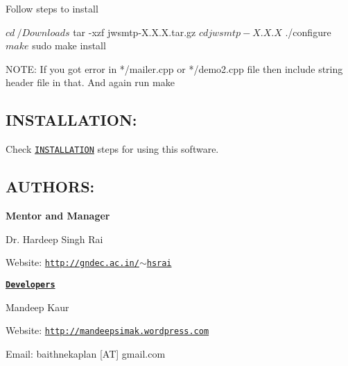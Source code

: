 Follow steps to install \begin{DoxyVerb}$ cd ~/Downloads
$ tar -xzf jwsmtp-X.X.X.tar.gz
$ cd jwsmtp-X.X.X
$ ./configure
$ make
$ sudo make install

NOTE: If you got error in */mailer.cpp or */demo2.cpp file then
include string header file in that. And again run make
\end{DoxyVerb}


\subsection*{I\-N\-S\-T\-A\-L\-L\-A\-T\-I\-O\-N\-: }

Check \href{https://github.com/GreatDevelopers/bakaplan/blob/master/INSTALLATION.txt}{\tt I\-N\-S\-T\-A\-L\-L\-A\-T\-I\-O\-N} steps for using this software.

\subsection*{A\-U\-T\-H\-O\-R\-S\-: }

{\bfseries Mentor and Manager}

Dr. Hardeep Singh Rai

Website\-: \href{http://gndec.ac.in/~hsrai}{\tt http\-://gndec.\-ac.\-in/$\sim$hsrai}

{\bfseries \href{https://github.com/GreatDevelopers/bakaplan/wiki/Contributors}{\tt Developers}}

Mandeep Kaur

Website\-: \href{http://mandeepsimak.wordpress.com}{\tt http\-://mandeepsimak.\-wordpress.\-com}

Email\-: baithnekaplan \mbox{[}A\-T\mbox{]} gmail.\-com 